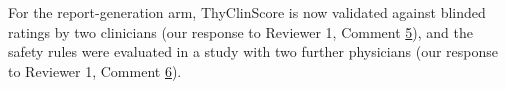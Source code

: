 For the report-generation arm, ThyClinScore is now validated against blinded ratings by two clinicians (our response to Reviewer 1, Comment \hyperref[rev:R1.5]{5}), and the safety rules were evaluated in a study with two further physicians (our response to Reviewer 1, Comment \hyperref[rev:R1.6]{6}).\par
